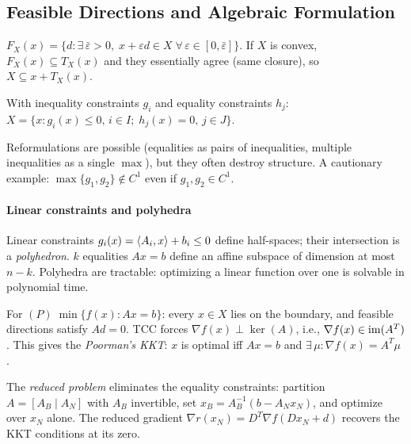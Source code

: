 \subsection{Feasible Directions and Algebraic Formulation}\label{ssec:feasible-directions}

\begin{defn}\label{def:feasible-dir}
	$F_X(x) = \{d : \exists\, \bar{\varepsilon} > 0,\; x + \varepsilon d \in X\;\forall\, \varepsilon \in [0, \bar{\varepsilon}]\}$.
	If $X$ is convex, $F_X(x) \subseteq T_X(x)$ and they essentially agree (same closure), so $X \subseteq x + T_X(x)$.
\end{defn}

\begin{defn}\label{def:algebraic}
	With inequality constraints $g_i$ and equality constraints $h_j$:
	$X = \{x : g_i(x) \leq 0,\, i \in I;\; h_j(x) = 0,\, j \in J\}$.
\end{defn}

Reformulations are possible (equalities as pairs of inequalities, multiple inequalities as a single $\max$), but they often destroy structure.
A cautionary example: $\max\{g_1, g_2\} \notin C^1$ even if $g_1, g_2 \in C^1$.

\paragraph{Linear constraints and polyhedra}

Linear constraints $g_i(x) = \langle A_i, x\rangle + b_i \leq 0$ define half-spaces; their intersection is a \textit{polyhedron}.
$k$ equalities $Ax = b$ define an affine subspace of dimension at most $n - k$.
Polyhedra are tractable: optimizing a linear function over one is solvable in polynomial time.

For $(P)\; \min\{f(x) : Ax = b\}$: every $x \in X$ lies on the boundary, and feasible directions satisfy $Ad = 0$.
TCC forces $\nabla f(x) \perp \ker(A)$, i.e., $\nabla f(x) \in \operatorname{im}(A^T)$.
This gives the \textit{Poorman's KKT}: $x$ is optimal iff $Ax = b$ and $\exists\, \mu : \nabla f(x) = A^T \mu$ \cite{luenberger2008}.

The \textit{reduced problem} eliminates the equality constraints: partition $A = [A_B \mid A_N]$ with $A_B$ invertible, set $x_B = A_B^{-1}(b - A_N x_N)$, and optimize over $x_N$ alone.
The reduced gradient $\nabla r(x_N) = D^T \nabla f(Dx_N + d)$ recovers the KKT conditions at its zero.


